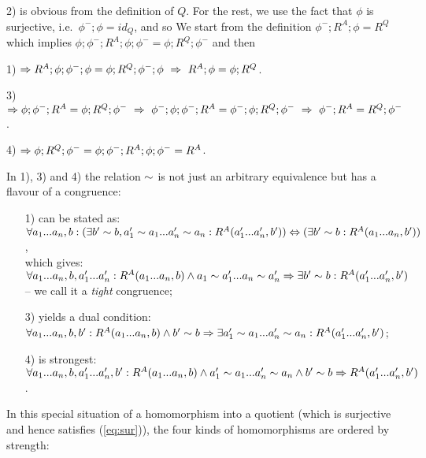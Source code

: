 \documentclass[10pt]{article}
\begin{document}
\begin{Proof}
2) is obvious from the definition of $Q$. For the rest, we use the
fact that $\phi$ is surjective, i.e.\ $\phi^-;\phi=id_Q$, and so 
We start from the definition $\phi^-;R^A;\phi=R^Q$ which implies
$\phi;\phi^-;R^A;\phi;\phi^- = \phi;R^Q;\phi^-$ and then

1) $\impl R^A;\phi;\phi^-;\phi= \phi;R^Q;\phi^-;\phi \ 
   \impl \ R^A;\phi=\phi;R^Q$.

3) $\impl \phi;\phi^-;R^A = \phi;R^Q;\phi^- \ 
   \impl \ \phi^-;\phi;\phi^-;R^A = \phi^-;\phi;R^Q;\phi^- \ 
   \impl \ \phi^-;R^A = R^Q;\phi^-$.

4) $\Rightarrow \phi;R^Q;\phi^-=\phi;\phi^-;R^A;\phi;\phi^- = R^A$.
\end{Proof}

\noindent
In 1), 3) and 4) the relation $\sim$ is not just an arbitrary
equivalence but has a flavour of a congruence:

\begin{itemize}\MyLPar
\item[1)]
can be stated as: \\
$\forall a_{1}...a_{n},b: (\exists b'\sim b,a'_1\sim
a_1...a'_n\sim a_n:R^A(a'_{1}...a'_{n},b')) \Leftrightarrow (\exists b'\sim b: R^A(a_{1}...a_{n},b'))$,
\\ which gives: \\
$\forall a_{1}...a_{n},b, a'_{1}...a'_{n}: R^A(a_{1}...a_{n},b)\land a_1\sim a'_1...a_n\sim a'_n 
\Rightarrow \exists
b'\sim b:R^A(a'_{1}...a'_{n},b')$ \\ -- we call it a {\em tight} congruence;

\item[3)]
yields a dual condition: \\ $\forall a_{1}...a_{n}, b,b': R^A(a_{1}...a_{n},b) \land
b'\sim b \Rightarrow \exists a'_1\sim a_1...a'_n\sim a_n : R^A(a'_{1}...a'_{n},b')$;

\item[4)] 
is strongest: $\forall a_{1}...a_{n},b,a'_{1}...a'_{n},b': R^A(a_{1}...a_{n},b)\land
 a'_1\sim a_1...a'_n\sim a_n \land b'\sim b\Rightarrow R^A(a'_{1}...a'_{n},b')$. 
\end{itemize}
%
In this special situation of a homomorphism into a quotient (which is
surjective and hence satisfies (\ref{eq:sur})), the four kinds of
homomorphisms are ordered by strength: 
\eq{ 
\raisebox{.8ex}{4}
\stackrel{\displaystyle{\nearrow}}\searrow \
\stackrel{{\displaystyle{\raisebox{2.5ex}{1}} }}
{\displaystyle{\raisebox{-1ex}{3}}} \
\stackrel{\displaystyle{\searrow}}\nearrow \raisebox{.8ex}{2}
\label{eq:homimpl}
}
\end{document}
